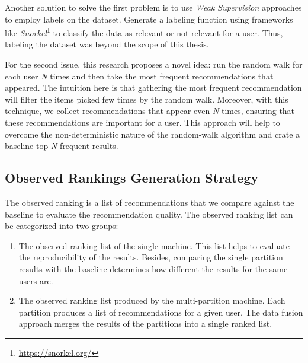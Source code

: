 Another solution to solve the first problem is to use \emph{Weak Supervision} approaches to employ labels on the dataset. Generate a labeling function using frameworks like \emph{Snorkel}\footnote{\url{https://snorkel.org/}} to classify the data as relevant or not relevant for a user. Thus, labeling the dataset was beyond the scope of this thesis.


For the second issue, this research proposes a novel idea: run the random walk for each user \emph{N} times and then take the most frequent recommendations that appeared. The intuition here is that gathering the most frequent recommendation will filter the items picked few times by the random walk. Moreover, with this technique, we collect recommendations that appear even \emph{N} times, ensuring that these recommendations are important for a user. This approach will help to overcome the non-deterministic nature of the random-walk algorithm and crate a baseline top \emph{N} frequent results.


\subsection{Observed Rankings Generation Strategy}
\label{subsec:comparing-recommendtions}
The observed ranking is a list of recommendations that we compare against the baseline to evaluate the recommendation quality. The observed ranking list can be categorized into two groups:

\begin{enumerate}
    \item The observed ranking list of the single machine. This list helps to evaluate the reproducibility of the results. Besides, comparing the single partition results with the baseline determines how different the results for the same users are. 
    
    \item The observed ranking list produced by the multi-partition machine. Each partition produces a list of recommendations for a given user. The data fusion approach merges the results of the partitions into a single ranked list. 
\end{enumerate}

